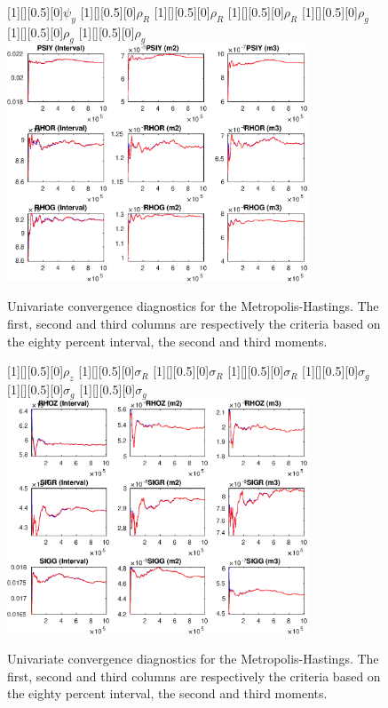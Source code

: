 \begin{figure}[H]
[1][][0.5][0]{$ {\psi_y} $}
[1][][0.5][0]{$ {\rho_R} $}
[1][][0.5][0]{$ {\rho_R} $}
[1][][0.5][0]{$ {\rho_R} $}
[1][][0.5][0]{$ {\rho_{g}} $}
[1][][0.5][0]{$ {\rho_{g}} $}
[1][][0.5][0]{$ {\rho_{g}} $}
\centering 
\includegraphics[width=0.80\textwidth]{AnSchoModTheBuilder/Output/AnSchoModTheBuilder_udiag3}
\caption{Univariate convergence diagnostics for the Metropolis-Hastings.
The first, second and third columns are respectively the criteria based on
the eighty percent interval, the second and third moments.}\label{Fig:UnivariateDiagnostics:3}
\end{figure}

\begin{figure}[H]
[1][][0.5][0]{$ {\rho_z} $}
[1][][0.5][0]{$ {\sigma_R} $}
[1][][0.5][0]{$ {\sigma_R} $}
[1][][0.5][0]{$ {\sigma_R} $}
[1][][0.5][0]{$ {\sigma_{g}} $}
[1][][0.5][0]{$ {\sigma_{g}} $}
[1][][0.5][0]{$ {\sigma_{g}} $}
\centering 
\includegraphics[width=0.80\textwidth]{AnSchoModTheBuilder/Output/AnSchoModTheBuilder_udiag4}
\caption{Univariate convergence diagnostics for the Metropolis-Hastings.
The first, second and third columns are respectively the criteria based on
the eighty percent interval, the second and third moments.}\label{Fig:UnivariateDiagnostics:4}
\end{figure}

